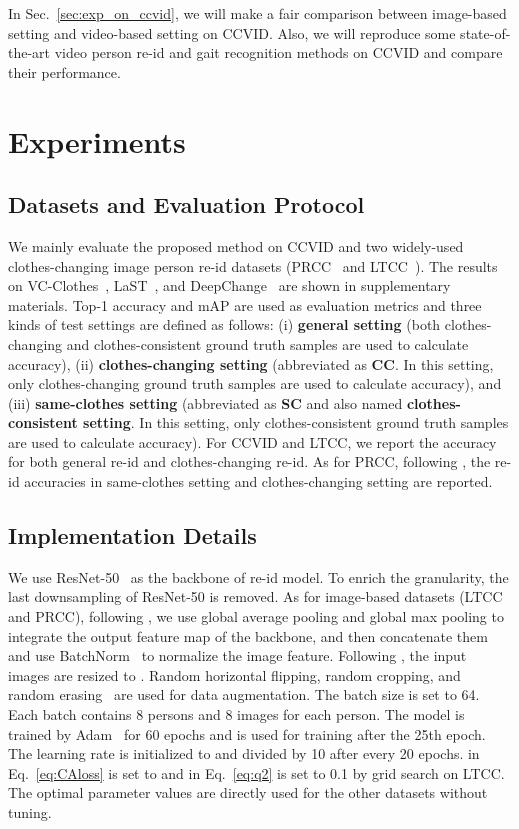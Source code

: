 \documentclass[10pt,twocolumn,letterpaper]{article}
\begin{document}
In Sec.~\ref{sec:exp_on_ccvid}, we will make a fair comparison between image-based setting and video-based setting on CCVID.
Also, we will reproduce some state-of-the-art video person re-id and gait recognition methods on CCVID and compare their performance.

\section{Experiments}
\label{sec:exp}

\subsection{Datasets and Evaluation Protocol}
We mainly evaluate the proposed method on CCVID and two widely-used clothes-changing image person re-id datasets (\ie PRCC~\cite{Yang2019PRCC} and LTCC~\cite{Qian2020LTCC}).
The results on VC-Clothes~\cite{Real28}, LaST~\cite{LaST}, and DeepChange~\cite{DeepChange} are shown in supplementary materials. Top-1 accuracy and mAP are used as evaluation metrics and three kinds of test settings are defined as follows:
(i) \textbf{general setting} (both clothes-changing and clothes-consistent ground truth samples are used to calculate accuracy),
(ii) \textbf{clothes-changing setting} (abbreviated as \textbf{CC}. In this setting, only clothes-changing ground truth samples are used to calculate accuracy), and (iii) \textbf{same-clothes setting} (abbreviated as \textbf{SC} and also named \textbf{clothes-consistent setting}. In this setting, only clothes-consistent ground truth samples are used to calculate accuracy).
For CCVID and LTCC, we report the accuracy for both general re-id and clothes-changing re-id.
As for PRCC, following \cite{Yang2019PRCC}, the re-id accuracies in same-clothes setting and clothes-changing setting are reported.


\subsection{Implementation Details}
\label{sec:detail}
We use ResNet-50~\cite{He2016Deep} as the backbone of re-id model. 
To enrich the granularity, the last downsampling of ResNet-50 is removed.
As for image-based datasets (\ie LTCC and PRCC), following \cite{Huang2021Clothing}, we use global average pooling and global max pooling to integrate the output feature map of the backbone, and then concatenate them and use BatchNorm~\cite{Ioffe2015BN} to normalize the image feature.
Following \cite{Qian2020LTCC}, the input images are resized to . Random horizontal flipping, random cropping, and random erasing~\cite{zhong2020random} are used for data augmentation. The batch size is set to 64. Each batch contains 8 persons and 8 images for each person. The model is trained by Adam~\cite{Kingma2014Adam} for 60 epochs and  is used for training after the 25th epoch.
The learning rate is initialized to  and divided by 10 after every 20 epochs. 
 in Eq.~\eqref{eq:CAloss} is set to  and  in Eq.~\eqref{eq:q2} is set to 0.1 by grid search on LTCC.
The optimal parameter values are directly used for the other datasets without tuning.
\end{document}
